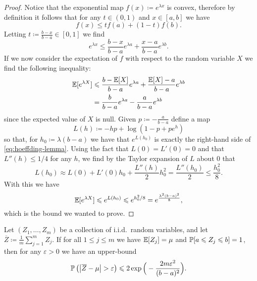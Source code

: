 \begin{proof}
Notice that the exponential map \(f(x) \coloneq e^{\lambda x}\) is convex,
therefore by definition it follows that for any \(t \in (0, 1)\) and \(x \in [a,
b]\) we have
\[
f(x) \leq t f(a) + (1 - t) f(b).
\]
Letting \(t \coloneq \frac{b - x}{b - a} \in [0, 1]\) we find
\[
e^{\lambda x} \leq \frac{b-x}{b-a} e^{\lambda a} + \frac{x-a}{b-a} e^{\lambda b}.
\]
If we now consider the expectation of \(f\) with respect to the random variable
\(X\) we find the following inequality:
\begin{align}\label{eq:hoeffding-lemma}
  \nonumber
  \operatorname{\mathbb{E}}[e^{\lambda X}]
  &\leqslant \frac{b - \operatorname{\mathbb{E}}[X]}{b - a} e^{\lambda a}
    + \frac{\operatorname{\mathbb{E}}[X] - a}{b - a} e^{\lambda b} \\
  &= \frac{b}{b - a} e^{\lambda a} - \frac{a}{b - a} e^{\lambda b}
\end{align}
since the expected value of \(X\) is null. Given \(p \coloneq -\frac{a}{b - a}\)
define a map
\[
L(h) \coloneq -h p + \log(1 - p + p e^h)
\]
so that, for \(h_0 \coloneq \lambda(b - a)\) we have that \(e^{L(h_0)}\) is
exactly the right-hand side of \cref{eq:hoeffding-lemma}. Using the fact that
\(L(0) = L'(0) = 0\) and that \(L''(h) \leq 1/4\) for any \(h\), we find by the
Taylor expansion of \(L\) about \(0\) that
\[
L(h_0) \approx L(0) + L'(0) h_0 + \frac{L''(h)}{2} h_0^2 = \frac{L''(h_0)}{2}
\leq \frac{h_0^2}{8}.
\]
With this we have
\[
\operatorname{\mathbb{E}}[e^{\lambda X}] \leqslant e^{L(h_0)} \leqslant e^{h_0^2/8}
= e^{\frac{\lambda^2 (b - a)^2}{8}},
\]
which is the bound we wanted to prove.
\end{proof}

\begin{lemma}
\label{lem:hoeffding-inequality}
Let \((Z_1, \dots, Z_m)\) be a collection of i.i.d.~random variables,
and let \(\overline Z \coloneq \frac{1}{m} \sum_{j=1}^m Z_j\).  If for
all \(1 \leq j \leq m\) we have \(\operatorname{\mathbb{E}}[Z_j] = \mu\) and
\(\operatorname{\mathbb{P}}[a \leqslant Z_j \leqslant b] = 1\), then for any \(\varepsilon > 0\) we have
an upper-bound
\[
\operatorname{\mathbb{P}}\big( \big| \overline{Z} - \mu \big| > \varepsilon \big)
\leqslant 2 \exp\Big( -\frac{2 m \varepsilon^{2}}{(b - a)^2} \Big).
\]
\end{lemma}

